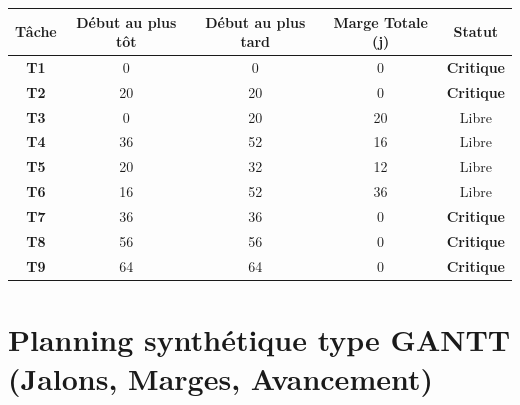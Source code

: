 \documentclass[11pt, a4paper]{article}
\begin{document}
\begin{table}[H]
\centering
\small
\begin{tabular}{ccccc}
\toprule
\textbf{Tâche} & \textbf{Début au plus tôt} & \textbf{Début au plus tard} & \textbf{Marge Totale (j)} & \textbf{Statut} \\
\midrule
\textbf{T1} & 0 & 0 & 0 & \textbf{\color{critical}Critique} \\
\textbf{T2} & 20 & 20 & 0 & \textbf{\color{critical}Critique} \\
\textbf{T3} & 0 & 20 & 20 & Libre \\
\textbf{T4} & 36 & 52 & 16 & Libre \\
\textbf{T5} & 20 & 32 & 12 & Libre \\
\textbf{T6} & 16 & 52 & 36 & Libre \\
\textbf{T7} & 36 & 36 & 0 & \textbf{\color{critical}Critique} \\
\textbf{T8} & 56 & 56 & 0 & \textbf{\color{critical}Critique} \\
\textbf{T9} & 64 & 64 & 0 & \textbf{\color{critical}Critique} \\
\bottomrule
\end{tabular}
\end{table}

\section{Planning synthétique type GANTT (Jalons, Marges, Avancement)}
\end{document}
